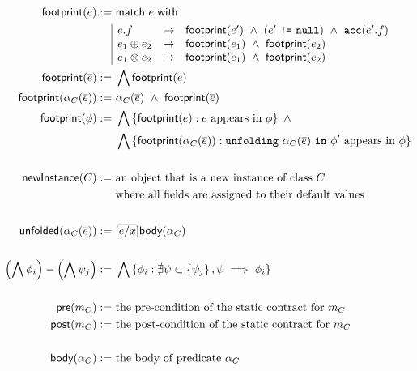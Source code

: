 \begin{spacing}{1.5}
\begin{align*}
\tsf{footprint}(e) :=
  & \ \tsf{match} \ e \ \tsf{with} \\
  & \begin{array}{|lcl}
      e.f &\mt&
        \tsf{footprint}(e\p) \ \land \
        (e\p \ \code{!=} \ \code{null}) \ \land \
        \code{acc}(e\p.f) \\
      e_1 \oplus e_2 &\mt&
        \tsf{footprint}(e_1) \ \land \ \tsf{footprint}(e_2) \\
      e_1 \otimes e_2 &\mt&
        \tsf{footprint}(e_1) \ \land \ \tsf{footprint}(e_2) \\
    \end{array} \\
\tsf{footprint}(\overline{e}) :=
  & \ \bigwedge \tsf{footprint}(e) \\
\tsf{footprint}(\alpha_C(\overline{e})) :=
  & \ \alpha_C(\overline{e}) \ \land \ \tsf{footprint}(\overline{e}) \\
\tsf{footprint}(\phi) :=
  & \ \bigwedge\set{ \tsf{footprint}(e) : e \ \text{appears in} \ \phi } \ \land \\
  & \ \bigwedge\set{ \tsf{footprint}(\alpha_C(\overline{e})) : \code{unfolding} \ \alpha_C(\overline{e}) \ \code{in} \ \phi\p \ \text{appears in} \ \phi } \\
\\
\tsf{newInstance}(C) :=
  & \ \text{an object that is a new instance of class $C$} \\
  & \ \text{where all fields are assigned to their default values} \\
\\
\tsf{unfolded}(\alpha_C(\overline{e})) :=
  & \ [ \overline{e/x} ] \tsf{body}(\alpha_C) \\
\\
\left(\bigwedge \phi_i\right) - \left(\bigwedge \psi_j\right) :=
  & \ \bigwedge\set{ \phi_i : \nexists \psi \subset \set{ \psi_j }, \psi \implies \phi_i } \\
\\
\tsf{pre}(m_C ) := & \ \text{the pre-condition of the static contract for} \ m_C \\
\tsf{post}(m_C) := & \ \text{the post-condition of the static contract for} \ m_C \\
\\
\tsf{body}(\alpha_C) := & \ \text{the body of predicate} \ \alpha_C \\
\end{align*}
\end{spacing}
